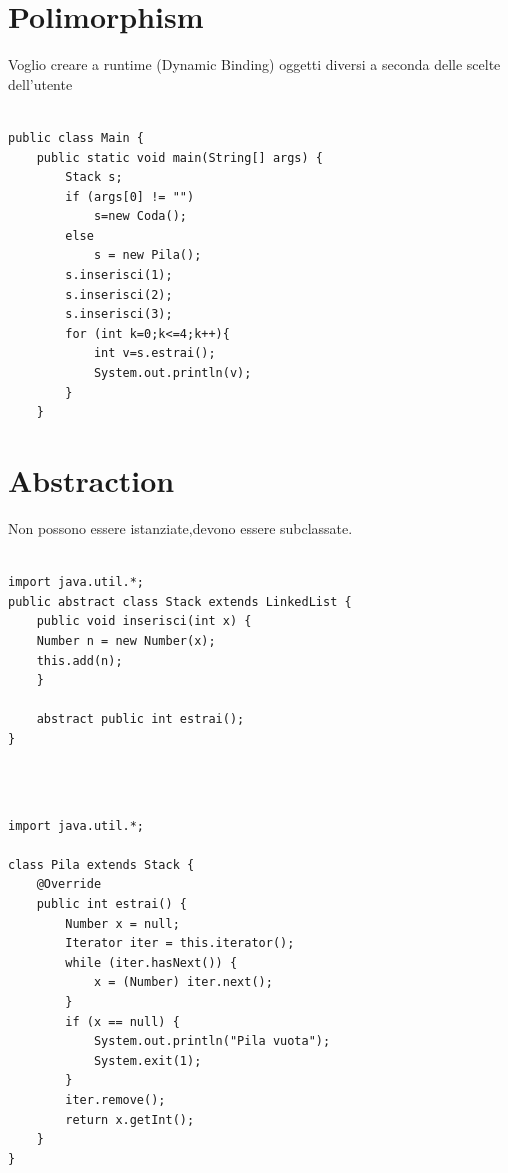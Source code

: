 \documentclass[10pt,a4paper]{book}
\begin{document}
\section{Polimorphism}
Voglio creare a runtime (Dynamic Binding) oggetti diversi a seconda delle scelte dell'utente\\\\
\begin{verbatim}
public class Main {
    public static void main(String[] args) {
        Stack s;
        if (args[0] != "")
            s=new Coda();
        else
            s = new Pila();
        s.inserisci(1);
        s.inserisci(2);
        s.inserisci(3);
        for (int k=0;k<=4;k++){
            int v=s.estrai();
            System.out.println(v);
        }
    }

\end{verbatim}
\newpage
\section{Abstraction}
Non possono essere istanziate,devono essere subclassate.\\\\
\begin{verbatim}
import java.util.*;
public abstract class Stack extends LinkedList {
    public void inserisci(int x) {
    Number n = new Number(x);
    this.add(n);
    }

    abstract public int estrai();
}

\end{verbatim}
\\\\
\begin{verbatim}
import java.util.*;

class Pila extends Stack {
    @Override
    public int estrai() {
        Number x = null;
        Iterator iter = this.iterator();
        while (iter.hasNext()) {
            x = (Number) iter.next();
        }
        if (x == null) {
            System.out.println("Pila vuota");
            System.exit(1);
        }
        iter.remove();
        return x.getInt();
    }
}

\end{verbatim}
\newpage
\end{document}
